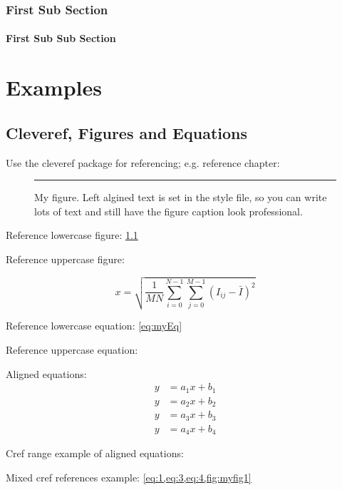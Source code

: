 \documentclass[12pt]{book}
\begin{document}
\subsection{First Sub Section}
\blindtext

\subsubsection{First Sub Sub Section}
\Blindtext

\chapter{Examples}\label{chap:one}
\section{Cleveref, Figures and Equations}

Use the cleveref package for referencing; e.g. reference chapter: 

\begin{figure}[h!]
  \centering
  \rule{20pt}{20pt}
  \caption{My figure. Left algined text is set in the style file, so you can write lots of text and still have the figure caption look professional.}
  \label{fig:myfig1}
\end{figure}

\noindent Reference lowercase figure: \cref{fig:myfig1}

\noindent Reference uppercase figure: 

\begin{equation} 
  x = \sqrt{\frac{1}{M N}\sum_{i=0}^{N-1}\sum_{j=0}^{M - 1}(I_{ij} - \bar{I})^2} \label{eq:myEq}
\end{equation}

\noindent Reference lowercase equation: \cref{eq:myEq}

\noindent Reference uppercase equation: 

\noindent Aligned equations:
\begin{align}
  y&=a_1x+b_1\label{eq:1}\\
  y&=a_2x+b_2\label{eq:2}\\
  y&=a_3x+b_3\label{eq:3}\\
  y&=a_4x+b_4\label{eq:4}
\end{align}

\noindent Cref range example of aligned equations: 
 
\noindent Mixed cref references example: \cref{eq:1,eq:3,eq:4,fig:myfig1}
\end{document}
